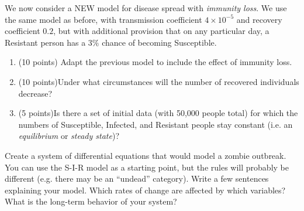 \documentclass[12pt]{article}
\newenvironment{problem}[1]{\begin{trivlist}
\item[\hskip \labelsep {\bfseries #1}]}{\end{trivlist}}
\begin{document}
\begin{problem}{Problem 2.}
	We now consider a NEW model for disease spread with \emph{immunity loss}. We use the same model as before, with transmission coefficient $4\times 10^{-5}$ and recovery coefficient $0.2$, but with additional provision that on any particular day, a Resistant person has a $3\%$ chance of becoming Susceptible.
	
	\begin{enumerate}
		\item (10 points) Adapt the previous model to include the effect of immunity loss. 
		\item (10 points)Under what circumstances will the number of recovered individuals decrease?
		\item (5 points)Is there a set of initial data (with 50,000 people total) for which the numbers of Susceptible, Infected, and Resistant people stay constant (i.e. an \emph{equilibrium} or \emph{steady state})?
	\end{enumerate}
	
	\item Create a system of differential equations that would model a zombie outbreak. You can use the S-I-R model as a starting point, but the rules will probably be different (e.g. there may be an ``undead'' category). Write a few sentences explaining your model. Which rates of change are affected by which variables? What is the long-term behavior of your system?
	

\end{problem}
\end{document}
